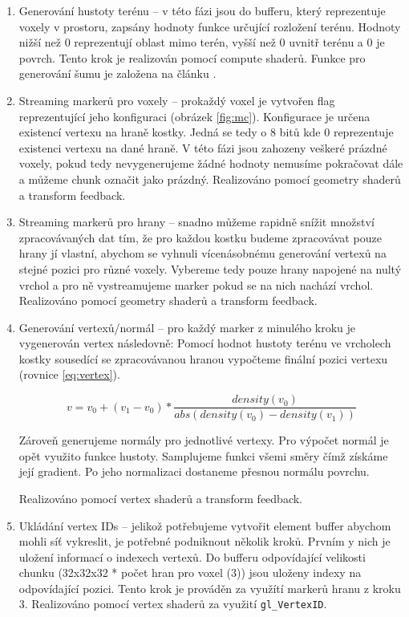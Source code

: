 \documentclass[12pt,a4paper,titlepage,final]{report}
\begin{document}
\begin{enumerate}
    \item Generování hustoty terénu -- v této fázi jsou do bufferu, který reprezentuje voxely v prostoru, zapsány hodnoty funkce určující rozložení terénu. Hodnoty nižší než 0 reprezentují oblast mimo terén, vyšší než 0 uvnitř terénu a 0 je povrch. Tento krok je realizován pomocí compute shaderů. Funkce pro generování šumu je založena na článku \cite{Backes2018RealTimeMT}.
    \item Streaming markerů pro voxely -- prokaždý voxel je vytvořen flag reprezentující jeho konfiguraci (obrázek \ref{fig:mc}). Konfigurace je určena existencí vertexu na hraně kostky. Jedná se tedy o 8 bitů kde 0 reprezentuje existenci vertexu na dané hraně. V této fázi jsou zahozeny veškeré prázdné voxely, pokud tedy nevygenerujeme žádné hodnoty nemusíme pokračovat dále a můžeme chunk označit jako prázdný. Realizováno pomocí geometry shaderů a transform feedback.
    \item Streaming markerů pro hrany -- snadno můžeme rapidně snížit množství zpracovávaných dat tím, že pro každou kostku budeme zpracovávat pouze hrany jí vlastní, abychom se vyhnuli vícenásobnému generování vertexů na stejné pozici pro různé voxely. Vybereme tedy pouze hrany napojené na nultý vrchol a pro ně vystreamujeme marker pokud se na nich nachází vrchol. Realizováno pomocí geometry shaderů a transform feedback.
    \item Generování vertexů/normál -- pro každý marker z minulého kroku je vygenerován vertex následovně: Pomocí hodnot hustoty terénu ve vrcholech kostky sousedící se zpracovávanou hranou vypočteme finální pozici vertexu (rovnice \ref{eq:vertex}). 

    \begin{equation}\label{eq:vertex}
    v = v_0 + (v_1 - v_0) * \frac{density(v_0)}{abs(density(v_0) - density(v_1))}
    \end{equation}

    Zároveň generujeme normály pro jednotlivé vertexy. Pro výpočet normál je opět využito funkce hustoty. Samplujeme funkci všemi směry čímž získáme její gradient. Po jeho normalizaci dostaneme přesnou normálu povrchu.
    
    Realizováno pomocí vertex shaderů a transform feedback.
    
    \item Ukládání vertex IDs -- jelikož potřebujeme vytvořit element buffer abychom mohli síť vykreslit, je potřebné podniknout několik kroků. Prvním y nich je uložení informací o indexech vertexů. Do bufferu odpovídající velikosti chunku (32x32x32 * počet hran pro voxel (3)) jsou uloženy indexy na odpovídající pozici. Tento krok je prováděn za využítí markerů hranu z kroku 3. Realizováno pomocí vertex shaderů za využití \texttt{gl\_VertexID}.
    

\end{enumerate}
\end{document}

